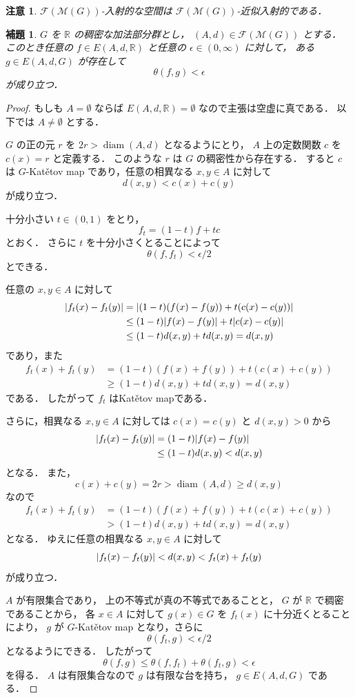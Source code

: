 \documentclass[leqno, 12pt]{jsarticle}
\newtheorem{lem}[thm]{補題}
\newtheorem*{rmk}{注意}
\newcommand{\rr}{\mathbb{R}}
\DeclareMathOperator{\di}{diam}
\DeclarePairedDelimiter{\abs}{\lvert}{\rvert}
\newcommand{\Met}[1]{\mathscr{M}(#1)}
\newcommand{\FinitePart}[1]{\mathscr{F}(#1)}
\newcommand{\FinMet}[1]{\FinitePart{\Met{#1}}}
\newcommand{\Espace}[3]{E(#1,#2,#3)}
\newcommand{\KatDist}{\theta}
\begin{document}
\begin{rmk}\label{rmk:katetov:injective-implies-approximate}
$\FinMet{G}$-入射的な空間は
$\FinMet{G}$-近似入射的である．
\end{rmk}


\begin{lem}\label{lem:katetov:dense-valued-approximation}
$G$
を
$\rr$
の稠密な加法部分群とし，
$(A,d)\in\FinMet{G}$
とする．
このとき任意の
$f\in\Espace{A}{d}{\rr}$
と任意の
$\epsilon\in(0,\infty)$
に対して，
ある
$g\in\Espace{A}{d}{G}$
が存在して
\[
\KatDist(f,g)<\epsilon
\]
が成り立つ．
\end{lem}
\begin{proof}
もしも
$A=\emptyset$
ならば
$\Espace{A}{d}{\rr}=\emptyset$
なので主張は空虚に真である．
以下では
$A\neq\emptyset$
とする．

$G$
の正の元
$r$
を
$2r>\di(A,d)$
となるようにとり，
$A$
上の定数関数
$c$
を
$c(x)=r$
と定義する．
このような
$r$
は
$G$
の稠密性から存在する．
すると
$c$
は
$G$-Kat\v{e}tov map
であり，任意の相異なる
$x,y\in A$
に対して
\[
d(x,y)<c(x)+c(y)
\]
が成り立つ．


十分小さい
$t\in(0,1)$
をとり，
\[
f_t=(1-t)f+tc
\]
とおく．
さらに
$t$
を十分小さくとることによって
\[
\KatDist(f,f_t)<\epsilon/2
\]
とできる．


任意の
$x,y\in A$
に対して
\begin{align*}
\abs{f_t(x)-f_t(y)}
&=\abs{(1-t)(f(x)-f(y))+t(c(x)-c(y))}\\
&\le (1-t)\abs{f(x)-f(y)}
 +t\abs{c(x)-c(y)}\\
&\le (1-t)d(x,y)+td(x,y)
=d(x,y)
\end{align*}
であり，また
\begin{align*}
f_t(x)+f_t(y)
&=(1-t)(f(x)+f(y))+t(c(x)+c(y))\\
&\ge (1-t)d(x,y)+td(x,y)
=d(x,y)
\end{align*}
である．
したがって
$f_t$
はKat\v{e}tov mapである．


さらに，相異なる
$x,y\in A$
に対しては
$c(x)=c(y)$
と
$d(x,y)>0$
から
\begin{align*}
\abs{f_t(x)-f_t(y)}
&=(1-t)\abs{f(x)-f(y)}\\
&\le (1-t)d(x,y)
<d(x,y)
\end{align*}
となる．
また，
\[
c(x)+c(y)=2r>\di(A,d)\ge d(x,y)
\]
なので
\begin{align*}
f_t(x)+f_t(y)
&=(1-t)(f(x)+f(y))+t(c(x)+c(y))\\
&>(1-t)d(x,y)+td(x,y)
=d(x,y)
\end{align*}
となる．
ゆえに任意の相異なる
$x,y\in A$
に対して
\[
\abs{f_t(x)-f_t(y)}<d(x,y)<f_t(x)+f_t(y)
\]
が成り立つ．


$A$
が有限集合であり，
上の不等式が真の不等式であることと，
$G$
が
$\rr$
で稠密であることから，
各
$x\in A$
に対して
$g(x)\in G$
を
$f_t(x)$
に十分近くとることにより，
$g$
が
$G$-Kat\v{e}tov map
となり，さらに
\[
\KatDist(f_t,g)<\epsilon/2
\]
となるようにできる．
したがって
\[
\KatDist(f,g)
\le \KatDist(f,f_t)+\KatDist(f_t,g)
<\epsilon
\]
を得る．
$A$
は有限集合なので
$g$
は有限な台を持ち，
$g\in\Espace{A}{d}{G}$
である．
\end{proof}
\end{document}
